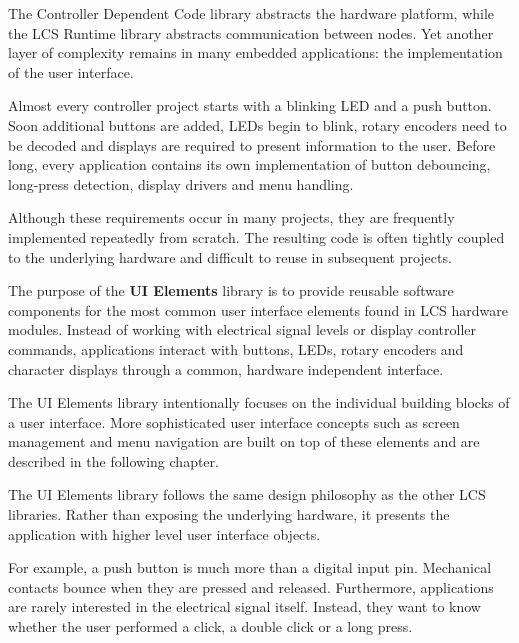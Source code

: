 %

The Controller Dependent Code library abstracts the hardware platform, while the
LCS Runtime library abstracts communication between nodes. Yet another layer of
complexity remains in many embedded applications: the implementation of the user
interface.

Almost every controller project starts with a blinking LED and a push button.
Soon additional buttons are added, LEDs begin to blink, rotary encoders need to
be decoded and displays are required to present information to the user. Before
long, every application contains its own implementation of button debouncing,
long-press detection, display drivers and menu handling.

Although these requirements occur in many projects, they are frequently
implemented repeatedly from scratch. The resulting code is often tightly coupled
to the underlying hardware and difficult to reuse in subsequent projects.

The purpose of the \textbf{UI Elements} library is to provide reusable software
components for the most common user interface elements found in LCS hardware
modules. Instead of working with electrical signal levels or display controller
commands, applications interact with buttons, LEDs, rotary encoders and
character displays through a common, hardware independent interface.

The UI Elements library intentionally focuses on the individual building blocks
of a user interface. More sophisticated user interface concepts such as screen
management and menu navigation are built on top of these elements and are
described in the following chapter.


The UI Elements library follows the same design philosophy as the other LCS
libraries. Rather than exposing the underlying hardware, it presents the
application with higher level user interface objects.

For example, a push button is much more than a digital input pin. Mechanical
contacts bounce when they are pressed and released. Furthermore, applications
are rarely interested in the electrical signal itself. Instead, they want to
know whether the user performed a click, a double click or a long press.

